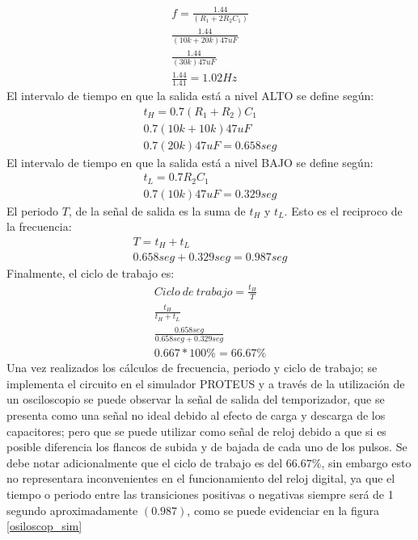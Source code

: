 \[\begin{array}{crl}
    f=\frac{1.44}{\left ( R_{1}+2R_{2}C_{1} \right )}
    \\
    \frac{1.44}{\left ( 10k+20k \right ) 47uF}
    \\
    \frac{1.44}{\left ( 30k \right ) 47uF}
    \\
    \frac{1.44}{1.41}=1.02Hz   
\end{array}\]
El intervalo de tiempo en que la salida está a nivel ALTO se define según:
\[\begin{array}{crl}
    t_{H}=0.7\left ( R_{1}+R_{2} \right )C_{1}
    \\
    0.7\left (10k+10k \right )47uF
    \\
    0.7\left ( 20k \right )47uF=0.658 seg
\end{array}\]
El intervalo de tiempo en que la salida está a nivel BAJO se define según: 
\[\begin{array}{crl}
    t_{L}=0.7R_{2}C_{1}
    \\ 
    0.7\left ( 10k \right )47uF=0.329 seg
\end{array}\]
El periodo $T$, de la señal de salida es la suma de $t_{H}$   y  $t_{L}$.  Esto es el reciproco de la frecuencia:
\[\begin{array}{crl}
    T=t_{H}+t_{L}
    \\
    0.658seg+0.329seg=0.987seg
\end{array}\]
Finalmente, el ciclo de trabajo es:
\[\begin{array}{crl}
    Ciclo~de~trabajo=\frac{t_{H}}{T}
    \\
    \frac{t_{H}}{t_{H}+t_{L}}
    \\
    \frac{0.658seg}{0.658seg+0.329seg}
    \\
    0.667*100\%=66.67\%
\end{array}\]
Una vez realizados los cálculos de frecuencia, periodo y ciclo de trabajo; se implementa el circuito en el simulador PROTEUS y a través de la utilización de un osciloscopio se puede observar la señal de salida del  temporizador, que se presenta como una señal no ideal debido al efecto de carga y descarga de los capacitores; pero que se puede utilizar como señal de reloj debido a que si es posible diferencia los flancos de subida y de bajada de cada uno de los pulsos.
Se debe notar adicionalmente que el ciclo de trabajo es del $66.67\%$, sin embargo esto no representara  inconvenientes  en  el  funcionamiento  del  reloj  digital,  ya  que  el  tiempo  o periodo  entre  las  transiciones  positivas  o  negativas  siempre  será  de  1  segundo aproximadamente $\left ( 0.987 \right )$, como se puede evidenciar en la figura \ref{osiloscop_sim}
